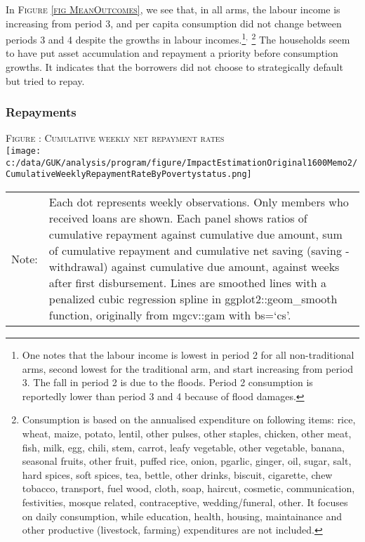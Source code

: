 	In \textsc{\footnotesize Figure \ref{fig MeanOutcomes}}, we see that, in all arms, the labour income is increasing from period 3, and per capita consumption did not change between periods 3 and 4 despite the growths in labour incomes.\footnote{One notes that the labour income is lowest in period 2 for all non-\textsf{traditional} arms, second lowest for the \textsf{traditional} arm, and start increasing from period 3. The fall in period 2 is due to the floods. Period 2 consumption is reportedly lower than period 3 and 4 because of flood damages. }$^{,}$ \footnote{Consumption is based on the annualised expenditure on following items: rice, wheat, maize, potato, lentil, other pulses, other staples, chicken, other meat, fish, milk, egg, chili, stem, carrot, leafy vegetable, other vegetable, banana, seasonal fruits, other fruit, puffed rice, onion, pgarlic, ginger, oil, sugar, salt, hard spices, soft spices, tea, bettle, other drinks, biscuit, cigarette, chew tobacco, transport, fuel wood, cloth, soap, haircut, cosmetic, communication, festivities, mosque related, contraceptive, wedding/funeral, other. It focuses on daily consumption, while education, health, housing, maintainance and other productive (livestock, farming) expenditures are not included.  } %
	The households seem to have put asset accumulation and repayment a priority before consumption growths. It indicates that the borrowers did not choose to strategically default but tried to repay. 

\subsubsection{Repayments}

\begin{table}
\hfil\textsc{\footnotesize Figure \thefigure: Cumulative weekly net repayment rates\label{fig weeklysavingrepayrate}}\\
\hfil\texttt{[image: c:/data/GUK/analysis/program/figure/ImpactEstimationOriginal1600Memo2/CumulativeWeeklyRepaymentRateByPovertystatus.png]}\\
\renewcommand{\arraystretch}{1}
\hfil\begin{tabular}{>{\hfill\scriptsize}p{1cm}<{}>{\scriptsize}p{12cm}<{\hfill}}
Note:& Each dot represents weekly observations. Only members who received loans are shown. Each panel shows ratios of cumulative repayment against cumulative due amount, sum of cumulative repayment and cumulative net saving (saving - withdrawal) against cumulative due amount, against weeks after first disbursement. Lines are smoothed lines with a penalized cubic regression spline in \textsf{ggplot2::geom\_smooth} function, originally from \textsf{mgcv::gam} with \textsf{bs=`cs'}. \\[-1ex]
\end{tabular}
\end{table}



